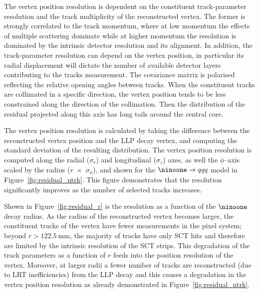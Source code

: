 \documentclass[PUB,UKenglish, texlive=2018]{\ATLASLATEXPATH atlasdoc}
\begin{document}
The vertex position resolution is dependent on the constituent track-parameter resolution and the track multiplicity of the reconstructed vertex. 
The former is strongly correlated to the track momentum, where at low momentum the effects of multiple scattering dominate while at higher momentum the resolution is dominated by the intrinsic detector resolution and its alignment.
In addition, the track-parameter resolution can depend on the vertex position, in particular its radial displacement will dictate the number of available detector layers contributing to the tracks measurement.
The covariance matrix is polarised reflecting the relative opening angles between tracks. 
When the constituent tracks are collimated in a specific direction, the vertex position tends to be less constrained along the direction of the collimation. 
Then the distribution of the residual projected along this axis has long tails around the central core.

The vertex position resolution is calculated by taking the difference between the reconstructed vertex position and the LLP decay vertex,
and computing the standard deviation of the resulting distribution.
The vertex position resolution is computed along the radial ($\sigma_{r}$) and longitudinal ($\sigma_{z}$) axes, as well the $\phi$--axis scaled by the radius ($r$~$\times$~$\sigma_{\phi}$),
and shown for the $\ninoone \rightarrow qqq$ model in Figure~\ref{fig:residual_ntrk}.  This figure demonstrates that the resolution significantly improves as the number of selected tracks increases.

Shown in Figure~\ref{fig:residual_r} is the resolution as a function of the $\ninoone$ decay radius.
As the radius of the reconstructed vertex becomes larger, the constituent tracks of the vertex have fewer measurements in the pixel system;
beyond $r>122.5~\mathrm{mm}$, the majority of tracks have only SCT hits and therefore are limited by the intrinsic resolution of the SCT strips.
This degradation of the track parameters as a function of $r$ feeds into the position resolution of the vertex.
Moreover, at larger radii a fewer number of tracks are reconstructed (due to LRT inefficiencies) from the LLP decay and this causes a degradation in the vertex position resolution as already demonstrated in Figure~\ref{fig:residual_ntrk}.
\end{document}
